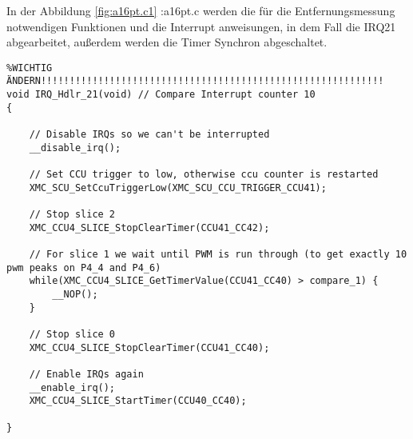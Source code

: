 
In der Abbildung \ref{fig:a16pt.c1} :a16pt.c werden die für die Entfernungsmessung notwendigen Funktionen und die Interrupt anweisungen, in dem Fall die IRQ21 abgearbeitet, außerdem werden die Timer Synchron abgeschaltet.
\\
\begin{minipage}{1\textwidth}
\begin{lstlisting}
%WICHTIG ÄNDERN!!!!!!!!!!!!!!!!!!!!!!!!!!!!!!!!!!!!!!!!!!!!!!!!!!!!!!!!!!!!
void IRQ_Hdlr_21(void) // Compare Interrupt counter 10
{
	
	// Disable IRQs so we can't be interrupted
	__disable_irq();

	// Set CCU trigger to low, otherwise ccu counter is restarted
	XMC_SCU_SetCcuTriggerLow(XMC_SCU_CCU_TRIGGER_CCU41);

	// Stop slice 2
	XMC_CCU4_SLICE_StopClearTimer(CCU41_CC42);

	// For slice 1 we wait until PWM is run through (to get exactly 10 pwm peaks on P4_4 and P4_6)
	while(XMC_CCU4_SLICE_GetTimerValue(CCU41_CC40) > compare_1) {
		__NOP();
	}

	// Stop slice 0
	XMC_CCU4_SLICE_StopClearTimer(CCU41_CC40);

	// Enable IRQs again
	__enable_irq();
	XMC_CCU4_SLICE_StartTimer(CCU40_CC40);

}
\end{lstlisting}
\label{fig:a16pt.c1}
\end{minipage}




